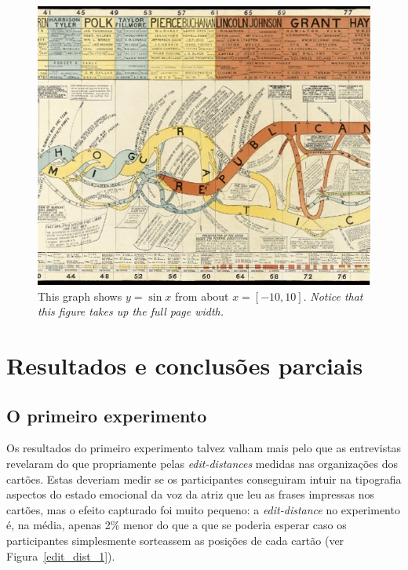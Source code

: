 \documentclass[a4paper]{tufte-handout}
\begin{document}
\begin{figure}[!htb]
  \includegraphics[width=\linewidth]{imgs/timeline-sample1.jpg}%
  \caption{This graph shows $y = \sin x$ from about $x = [-10, 10]$.
  \emph{Notice that this figure takes up the full page width.}}%
  \label{fig:fullfig}%
\end{figure}

\pagebreak 

\section{Resultados e conclusões parciais}\label{sec:resultados}

\subsection{O primeiro experimento}\label{result_prim_exp}

Os resultados do primeiro experimento talvez valham mais pelo que as entrevistas revelaram do que propriamente pelas \textit{edit-distances} medidas nas organizações dos cartões. Estas deveriam medir se os participantes conseguiram intuir na tipografia aspectos do estado emocional da voz da atriz que leu  as frases impressas nos cartões, mas o efeito capturado foi muito pequeno: a \textit{edit-distance} no experimento é, na média, apenas 2\% menor do que a que se poderia esperar caso os participantes simplesmente sorteassem as posições de cada cartão (ver Figura~\ref{edit_dist_1}).
\end{document}
